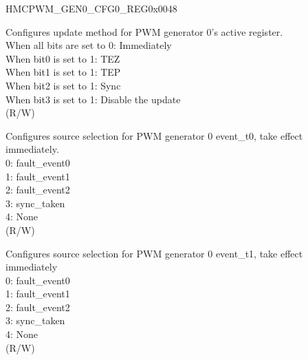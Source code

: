 \begin{register}{H}{MCPWM\_GEN0\_CFG0\_REG}{0x0048}\label{regdesc:MCPWMGEN0CFG0REG}
%
%
%
%
\regnewline%
\begin{regdesc}\begin{reglist}
\label{fielddesc:MCPWMGEN0CFGUPMETHOD}\item [MCPWM\_GEN0\_CFG\_UPMETHOD] Configures update method for PWM generator 0's active register.
\\When all bits are set to 0: Immediately
\\When bit0 is set to 1: TEZ
\\When bit1 is set to 1: TEP
\\When bit2 is set to 1: Sync
\\When bit3 is set to 1: Disable the update
\\(R/W)
\label{fielddesc:MCPWMGEN0T0SEL}\item [MCPWM\_GEN0\_T0\_SEL] Configures source selection for PWM generator 0 event\_t0, take effect immediately.
\\0: fault\_event0
\\1: fault\_event1
\\2: fault\_event2
\\3: sync\_taken
\\4: None
\\(R/W)
\label{fielddesc:MCPWMGEN0T1SEL}\item [MCPWM\_GEN0\_T1\_SEL] Configures source selection for PWM generator 0 event\_t1, take effect immediately
\\0: fault\_event0
\\1: fault\_event1
\\2: fault\_event2
\\3: sync\_taken
\\4: None
\\(R/W)
\end{reglist}\end{regdesc}
\end{register}


